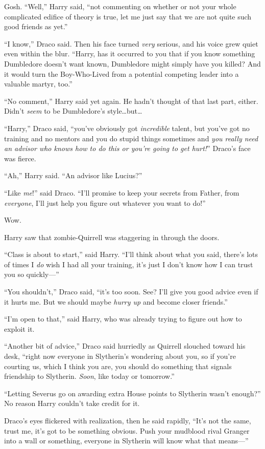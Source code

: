 Gosh. “Well,” Harry said, “not commenting on whether or not your whole complicated edifice of theory is true, let me just say that we are not quite such good friends as yet.”

“I know,” Draco said. Then his face turned \emph{very} serious, and his voice grew quiet even within the blur. “Harry, has it occurred to you that if you know something Dumbledore doesn’t want known, Dumbledore might simply have you killed? And it would turn the Boy-Who-Lived from a potential competing leader into a valuable martyr, too.”

“No comment,” Harry said yet again. He hadn’t thought of that last part, either. Didn’t \emph{seem} to be Dumbledore’s style…but…

“Harry,” Draco said, “you’ve obviously got \emph{incredible} talent, but you’ve got no training and no mentors and you do stupid things sometimes and \emph{you really need an advisor who knows how to do this or you’re going to get hurt!}” Draco’s face was fierce.

“Ah,” Harry said. “An advisor like Lucius?”

“Like \emph{me}!” said Draco. “I’ll promise to keep your secrets from Father, from \emph{everyone}, I’ll just help you figure out whatever you want to do!”

Wow.

Harry saw that zombie-Quirrell was staggering in through the doors.

“Class is about to start,” said Harry. “I’ll think about what you said, there’s lots of times I \emph{do} wish I had all your training, it’s just I don’t know how I can trust you so quickly—”

“You shouldn’t,” Draco said, “it’s too soon. See? I’ll give you good advice even if it hurts me. But we should maybe \emph{hurry up} and become closer friends.”

“I’m open to that,” said Harry, who was already trying to figure out how to exploit it.

“Another bit of advice,” Draco said hurriedly as Quirrell slouched toward his desk, “right now everyone in Slytherin’s wondering about you, so if you’re courting us, which I think you are, you should do something that signals friendship to Slytherin. \emph{Soon}, like today or tomorrow.”

“Letting Severus go on awarding extra House points to Slytherin wasn’t enough?” No reason Harry couldn’t take credit for it.

Draco’s eyes flickered with realization, then he said rapidly, “It’s not the same, trust me, it’s got to be something obvious. Push your mudblood rival Granger into a wall or something, everyone in Slytherin will know what that means—”

